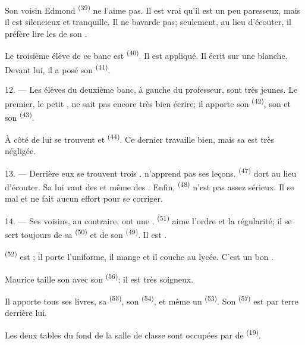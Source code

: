 Son voisin Edmond \textsuperscript{(39)} ne l'aime pas. Il est vrai qu'il est
un peu paresseux, mais il est silencieux et tranquille. Il ne bavarde pas;
seulement, au lieu d'écouter, il préfère lire les  de son
.

Le troisième élève de ce banc est  \textsuperscript{(40)}. Il est
appliqué. Il écrit sur une  blanche. Devant lui, il a
posé son  \textsuperscript{(41)}.

12. --- Les élèves du deuxième banc, à gauche du professeur, sont très jeunes.
Le premier, le petit , ne sait pas encore très bien écrire; il
apporte son  \textsuperscript{(42)}, son  et son  \textsuperscript{(43)}.

À côté de lui se trouvent  et 
\textsuperscript{(44)}. Ce dernier travaille bien, mais sa  est
très négligée.

13. --- Derrière eux se trouvent trois . 
n'apprend pas ses leçons.  \textsuperscript{(47)} dort au lieu
d'écouter. Sa  lui vaut des  et même des
. Enfin,  \textsuperscript{(48)} n'est pas
assez sérieux. Il se  mal et ne fait aucun effort pour se
corriger.

14. --- Ses voisins, au contraire, ont une .
 \textsuperscript{(51)} aime l'ordre et la régularité; il se
sert toujours de sa  \textsuperscript{(50)} et de son
 \textsuperscript{(49)}. Il est .

 \textsuperscript{(52)} est ; il porte
l'uniforme, il mange et il couche au lycée. C'est un bon .

Maurice taille son  avec son 
\textsuperscript{(56)}; il est très soigneux.

Il apporte tous ses livres, sa  \textsuperscript{(55)}, son
 \textsuperscript{(54)}, et même un
 \textsuperscript{(53)}. Son 
\textsuperscript{(57)} est par terre derrière lui.

Les deux tables du fond de la salle de classe sont occupées par de  \textsuperscript{(19)}.

